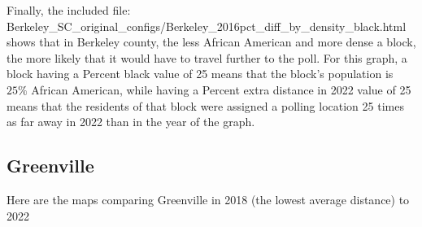 \documentclass[11pt]{article}
\theoremstyle{remark}
\theoremstyle{definition}
\begin{document}
Finally, the included file: \textrm{Berkeley\_SC\_original\_configs/Berkeley\_2016pct\_diff\_by\_density\_black.html} shows that in Berkeley county, the less African American and more dense a block, the more likely that it would have to travel further to the poll. For this graph, a block having a Percent black value of 25 means that the block's population is $25\%$ African American, while having a Percent extra distance in 2022 value of 25 means that the residents of that block were assigned a polling location 25 times as far away in 2022 than in the year of the graph.

\pagebreak

\subsection{Greenville} 
Here are the maps comparing Greenville in 2018 (the lowest average distance) to 2022
\end{document}
